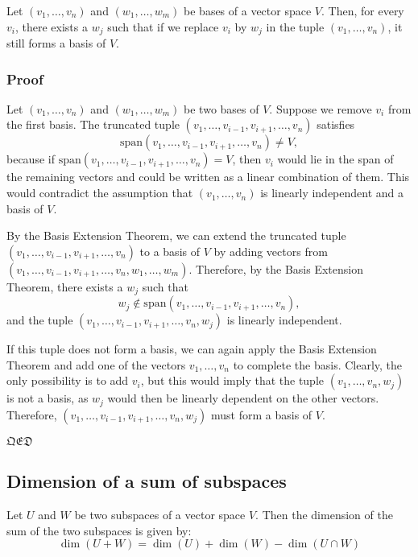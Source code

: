 Let $(v_1, \ldots, v_n)$ and $(w_1, \ldots, w_m)$ be bases of a vector space $V$. Then, for every $v_i$, there exists a $w_j$ such that if we replace $v_i$ by $w_j$ in the tuple $(v_1, \ldots, v_n)$, it still forms a basis of $V$.

\subsubsection*{Proof}

Let $(v_1, \ldots, v_n)$ and $(w_1, \ldots, w_m)$ be two bases of $V$. Suppose we remove $v_i$ from the first basis. The truncated tuple $(v_1, \ldots, v_{i-1}, v_{i+1}, \ldots, v_n)$ satisfies
\[
\text{span}(v_1, \ldots, v_{i-1}, v_{i+1}, \ldots, v_n) \neq V,
\]
because if $\text{span}(v_1, \ldots, v_{i-1}, v_{i+1}, \ldots, v_n) = V$, then $v_i$ would lie in the span of the remaining vectors and could be written as a linear combination of them. This would contradict the assumption that $(v_1, \ldots, v_n)$ is linearly independent and a basis of $V$.

By the Basis Extension Theorem, we can extend the truncated tuple $(v_1, \ldots, v_{i-1}, v_{i+1}, \ldots, v_n)$ to a basis of $V$ by adding vectors from $(v_1, \ldots, v_{i-1}, v_{i+1}, \ldots, v_n, w_1, \ldots, w_m)$. Therefore, by the Basis Extension Theorem, there exists a $w_j$ such that
\[
w_j \notin \text{span}(v_1, \ldots, v_{i-1}, v_{i+1}, \ldots, v_n),
\]
and the tuple $(v_1, \ldots, v_{i-1}, v_{i+1}, \ldots, v_n, w_j)$ is linearly independent.

If this tuple does not form a basis, we can again apply the Basis Extension Theorem and add one of the vectors $v_1, \ldots, v_n$ to complete the basis. Clearly, the only possibility is to add $v_i$, but this would imply that the tuple $(v_1, \ldots, v_n, w_j)$ is not a basis, as $w_j$ would then be linearly dependent on the other vectors. Therefore, $(v_1, \ldots, v_{i-1}, v_{i+1}, \ldots, v_n, w_j)$ must form a basis of $V$.

\noindent$\mathfrak{QED}$

\subsection{Dimension of a sum of subspaces}
Let $U$ and $W$ be two subspaces of a vector space $V$. Then the dimension of the sum of the two subspaces is given by:
\[
    \dim(U + W) = \dim(U) + \dim(W) - \dim(U \cap W)    
\]

